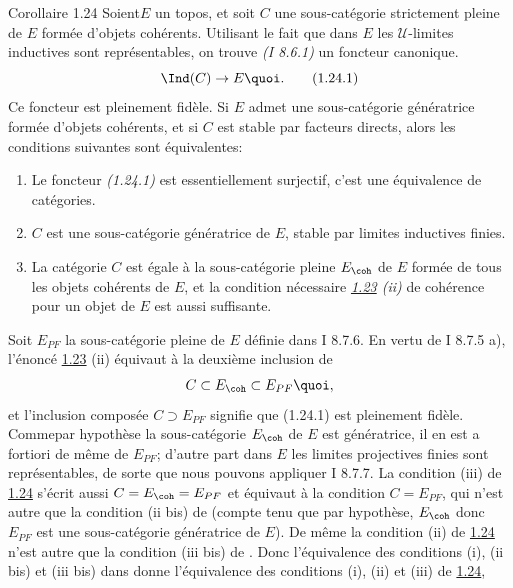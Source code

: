 \begin{enonce*}{Corollaire 1.24}
Soient\pageoriginale $E$ un topos, et soit $C$ une sous-catégorie
strictement pleine
de $E$ formée d'objets cohérents. Utilisant le fait que dans $E$ les
$𝒰$-limites inductives sont représentables, on trouve \emph{(I
  8.6.1)} un foncteur canonique.
\begin{equation*}
\Ind (C) \to E{\quoi}.\tag{1.24.1}
\end{equation*}
Ce foncteur est pleinement fidèle. Si $E$ admet une sous-catégorie
génératrice formée d'objets cohérents, et si $C$ est stable par
facteurs directs, alors les conditions suivantes sont équivalentes:
\begin{enumerate}
\renewcommand{\theenumi}{\roman{enumi}}
\renewcommand{\labelenumi}{(\theenumi)}
\item Le foncteur \emph{(1.24.1)} est essentiellement surjectif, \ie c'est
  une équivalence de catégories.

\item $C$ est une sous-catégorie génératrice de $E$, stable par
  limites inductives finies.

\item La catégorie $C$ est égale à la sous-catégorie pleine $E_{\coh}$
  de $E$ formée de tous les objets cohérents de $E$, et la condition
  nécessaire \emph{\hyperref[VI.thm1.23]{1.23} (ii)} de cohérence pour un objet de $E$ est
  aussi suffisante.
\end{enumerate}
\end{enonce*}

Soit $E_{PF}$ la sous-catégorie pleine de $E$ définie dans I 8.7.6. En
vertu de I 8.7.5 a), l'énoncé \hyperref[VI.thm1.23]{1.23} (ii) équivaut à la deuxième
inclusion de
$$
C \subset E_{\coh} \subset E_{PF}{\quoi},
$$
et l'inclusion composée $C \supset E_{PF}$ signifie que (1.24.1) est
pleinement fidèle. Comme\pageoriginale par hypothèse la sous-catégorie
$E_{\coh}$ de
$E$ est génératrice, il en est a fortiori de même de $E_{PF}$; d'autre
part dans $E$ les limites projectives finies sont représentables, de
sorte que nous pouvons appliquer I 8.7.7. La condition (iii) de \hyperref[VI.cor1.24]{1.24}
s'écrit aussi $C = E_{\coh} = E_{PF}$ et équivaut à la condition $C =
E_{PF}$, qui n'est autre que la condition (ii bis) de \loccit (compte
tenu que par hypothèse,  $E_{\coh}$ donc $E_{PF}$ est une
sous-catégorie génératrice de $E$). De même la condition (ii) de \hyperref[VI.cor1.24]{1.24}
n'est autre que la condition (iii bis) de \loccit. Donc l'équivalence
des conditions (i), (ii bis) et (iii bis) dans \loccit donne
l'équivalence des conditions (i), (ii) et (iii) de \hyperref[VI.cor1.24]{1.24}, \cqfd

